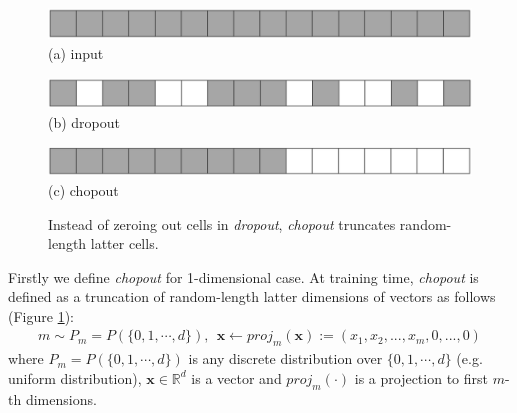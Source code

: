 \documentclass{article}
\begin{document}
    \begin{figure}[h]
    \begin{minipage}{0.33\linewidth}
      \begin{center}
        \includegraphics[scale=0.13]{input.png}
        \hspace{1.6cm} (a) input
      \end{center}
    \end{minipage}
    \begin{minipage}{0.33\linewidth}
      \begin{center}
        \includegraphics[scale=0.13]{dropout_applied}
        \hspace{1.6cm} (b) dropout
      \end{center}
    \end{minipage}
    \begin{minipage}{0.33\linewidth}
      \begin{center}
        \includegraphics[scale=0.13]{chopout_applied.png}
        \hspace{1.6cm} (c) chopout
      \end{center}
    \end{minipage}    
    \caption{Instead of zeroing out cells in \textit{dropout}, \textit{chopout} truncates random-length latter cells.}
    \label{fig:dropout_and_chopout}
    \end{figure}
    Firstly we define \textit{chopout} for 1-dimensional case.
    At training time, \textit{chopout} is defined as a truncation of random-length latter dimensions of vectors as follows (Figure \ref{fig:dropout_and_chopout}):
    \begin{align}
        m \sim P_m = P(\{0, 1, \cdots, d\}), \ \ 
        \mathbf{x} \leftarrow {proj}_m(\mathbf{x}) := (x_1, x_2, ..., x_m, 0, ..., 0) \nonumber
    \end{align}
    where $P_m = P(\{0, 1, \cdots, d\})$ is any discrete distribution over $\{0, 1, \cdots, d\}$ (e.g. uniform distribution), $\mathbf{x} \in \mathbb{R}^d$ is a vector and ${proj}_m(\cdot)$ is a projection to first $m$-th dimensions. 
\end{document}
